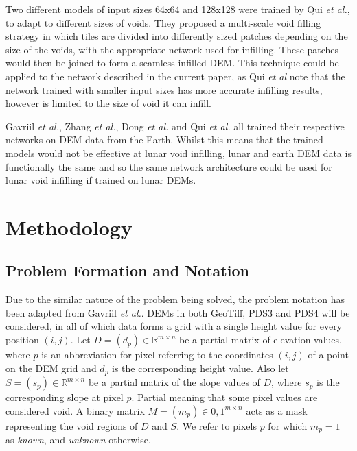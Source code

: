 \documentclass[twocolumn]{article}
\begin{document}
Two different models of input sizes 64x64 and 128x128 were trained by Qui \emph{et al.}, to adapt to different sizes of voids.
They proposed a multi-scale void filling strategy in which tiles are divided into differently sized patches depending on the size of the voids, with the appropriate network used for infilling.
These patches would then be joined to form a seamless infilled DEM.
This technique could be applied to the network described in the current paper, as Qui \emph{et al} note that the network trained with smaller input sizes has more accurate infilling results, however is limited to the size of void it can infill.

Gavriil \emph{et al.}, Zhang \emph{et al.}, Dong \emph{et al.} and Qui \emph{et al.} all trained their respective networks on DEM data from the Earth.
Whilst this means that the trained models would not be effective at lunar void infilling, lunar and earth DEM data is functionally the same and so the same network architecture could be used for lunar void infilling if trained on lunar DEMs.


\section{Methodology}
\label{sec:orge4d750e}

\subsection{Problem Formation and Notation}
\label{sec:orgbf3cad9}

Due to the similar nature of the problem being solved, the problem notation has been adapted from Gavriil \emph{et al.}\autocite{gavriilVoidFillingDigital2019}.
DEMs in both GeoTiff, PDS3 and PDS4 will be considered, in all of which data forms a grid with a single height value for every position \((i, j)\).
Let \(D = (d_p) \in \mathbb{R}^{m \times n}\) be a partial matrix of elevation values, where \(p\) is an abbreviation for pixel referring to the coordinates \((i,j)\) of a point on the DEM grid and \(d_p\) is the corresponding height value.
Also let \(S = (s_p) \in \mathbb{R}^{m \times n}\) be a partial matrix of the slope values of \(D\), where \(s_p\) is the corresponding slope at pixel \(p\).
Partial meaning that some pixel values are considered void.
A binary matrix \(M = (m_p) \in 0,1^{m \times n}\) acts as a mask representing the void regions of \(D\) and \(S\).
We refer to pixels \(p\) for which \(m_p = 1\) as \emph{known}, and \emph{unknown} otherwise.
\end{document}
